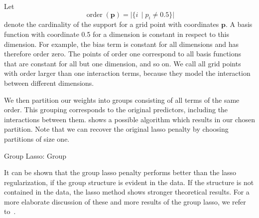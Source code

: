 Let
\begin{equation*}
  \operatorname{order}(\bm{p}) = \vert \{ i\, \mid p_i \neq 0.5 \} \vert
\end{equation*}
denote the cardinality of the support for a grid point with coordinates \(\bm{p}\).
A basis function with coordinate 0.5 for a dimension is constant in respect to
this dimension.
For example, the bias term is constant for all dimensions and has therefore
order zero.
The points of order one correspond to all basis functions that are constant for
all but one dimension, and so on.
We call all grid points with order larger than one interaction terms, because
they model the interaction between different dimensions.

We then partition our weights into groups consisting of all terms of the same order.
This grouping corresponds to the original predictors, including the interactions
between them.
 shows a possible algorithm which results in our chosen
partition.
Note that we can recover the original lasso penalty by choosing partitions of size one.

\begin{algorithm}[h]
\caption{Group Lasso: Group}\label{alg:group} 
 \begin{algorithmic}[1]
   \Statex
      \EndFor
        \Else
      \EndIf
    \EndFor
   \State {}
   \EndFunction
 \end{algorithmic}
 \end{algorithm}

It can be shown that the group lasso penalty performs better than the lasso
regularization, if the group structure is evident in the data.
If the structure is not contained in the data, the lasso method shows stronger
theoretical results.
For a more elaborate discussion of these and more results of the group lasso, we refer to~\cite{grouplasso-benefit}.

